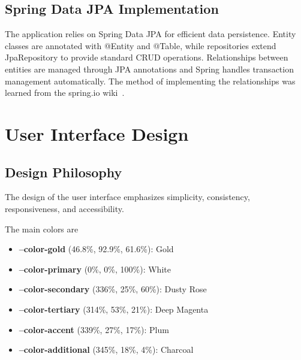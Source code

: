 \subsection{Spring Data JPA Implementation}\label{subsec:spring-data-jpa}

The application relies on Spring Data JPA for efficient data persistence.
Entity classes are annotated with @Entity and @Table, while repositories extend JpaRepository to provide standard CRUD operations.
Relationships between entities are managed through JPA annotations and Spring handles transaction management automatically.
The method of implementing the relationships was learned from the spring.io wiki~\cite{SpringDataJPA2024}.


\section{User Interface Design}\label{sec:ui-design}

\subsection{Design Philosophy}\label{subsec:design-philosophy}
The design of the user interface emphasizes simplicity, consistency, responsiveness, and accessibility.



The main colors are
\begin{itemize}
    \item \textcolor{colorGold}{\textbf{--color-gold} (46.8\%, 92.9\%, 61.6\%): Gold}
    \item \textbf{--color-primary} (0\%, 0\%, 100\%): White
    \item \textcolor{colorSecondary}{\textbf{--color-secondary} (336\%, 25\%, 60\%): Dusty Rose}
    \item \textcolor{colorTertiary}{\textbf{--color-tertiary} (314\%, 53\%, 21\%): Deep Magenta}
    \item \textcolor{colorAccent}{\textbf{--color-accent} (339\%, 27\%, 17\%): Plum}
    \item \textcolor{colorAdditional}{\textbf{--color-additional} (345\%, 18\%, 4\%): Charcoal}
\end{itemize}

